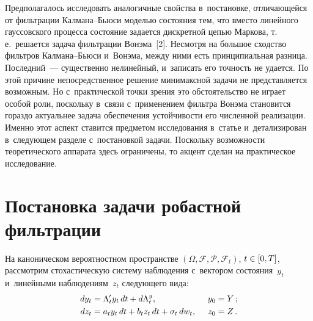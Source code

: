\begin{multicols}{2}
Предполагалось исследовать аналогичные свойства в~по\-ста\-нов\-ке, 
от\-ли\-ча\-ющей\-ся от фильт\-ра\-ции Кал\-ма\-на--Бью\-си моделью со\-сто\-яния тем, 
что вмес\-то линейного гауссовского процесса состояние задается дискретной 
цепью Маркова, т.\,е.\ решается задача фильт\-ра\-ции Вонэма~[2]. Не\-смот\-ря на 
большое сходство фильт\-ров Кал\-ма\-на--Бью\-си и~Вонэма, между ними есть 
принципиальная разница. По\-след\-ний~--- существенно нелинейный, 
и~записать его точ\-ность не удается. По этой причине непосредственное 
решение минимаксной задачи не пред\-став\-ля\-ет\-ся воз\-мож\-ным. Но 
с~практической точ\-ки зрения это обстоятельство не играет особой роли, 
поскольку в~связи с~применением фильт\-ра Вонэма становится гораздо 
актуальнее задача обеспечения устой\-чи\-вости его чис\-лен\-ной реализации. 
Именно этот аспект ставится предметом исследования в~статье 
и~детализирован в~сле\-ду\-ющем разделе с~по\-ста\-нов\-кой задачи. По\-сколь\-ку 
возможности тео\-ре\-ти\-че\-ско\-го аппарата здесь ограничены, то акцент сделан на 
практическое исследование.
     
\section{Постановка задачи робастной фильтрации}

     На каноническом вероятностном пространстве $(\Omega, \mathcal{F}, 
\mathcal{P}, \mathcal{F}_t)$, $t\hm\in [0,T]$, рас\-смот\-рим сто\-ха\-сти\-че\-скую 
сис\-те\-му наблюдения с~вектором со\-сто\-яния~$y_t$ и~линейными 
наблюдениям~$z_t$ сле\-ду\-юще\-го вида:
     \begin{alignat}{2}
     dy_t&= \Lambda_t^\prime y_t \,dt +d\Lambda_t^y, &\enskip y_0&=Y\,;
     \label{e1-bos}\\
     dz_t &= a_t y_t\, dt +b_t z_t\, dt +\sigma_t\, dw_t, &\enskip z_0&=Z\,.
     \label{e2-bos}
     \end{alignat}
     

\end{multicols}
